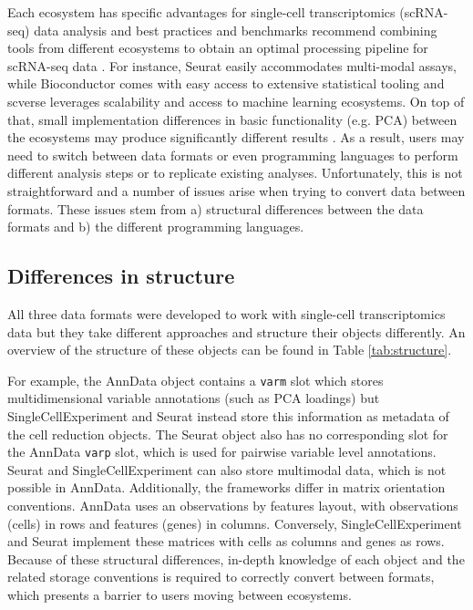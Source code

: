 \documentclass[unnumsec,webpdf,modern,large,namedate]{oup-authoring-template}%
\begin{document}
Each ecosystem has specific advantages for single-cell tran\-scriptomics (scRNA-seq) 
data analysis and best practices and benchmarks recommend combining tools from different ecosystems to obtain an optimal processing pipeline for scRNA-seq data \citep{Heumos2023-qa}. 
For instance, Seurat easily accommodates multi-modal assays, while Bioconductor comes with easy access to extensive statistical tooling and scverse leverages scalability and access to machine learning ecosystems.
On top of that, small implementation differences in basic functionality (e.g. PCA) between the ecosystems may produce significantly different results \citep{rich2024impact}.
As a result, users may need to switch between data formats or even programming languages to perform different analysis steps or to replicate existing analyses. 
Unfortunately, this is not straightforward and a number of issues arise when trying to convert data between formats. 
These issues stem from a) structural differences between the data formats and b) the different programming languages.

\subsection{Differences in structure}\label{structure}

All three data formats were developed to work with single-cell transcriptomics data but they take different approaches and structure their objects differently. An overview of the structure of these objects can be found in Table \ref{tab:structure}.

For example, the AnnData object contains a \texttt{varm} slot which stores 
multidimensional variable annotations (such as PCA loadings) but SingleCellExperiment 
and Seurat instead store this in\-for\-ma\-tion as metadata of the cell reduction objects. 
The Seurat object also has no corresponding slot for the AnnData \texttt{varp} slot, which is used for pairwise variable level annotations. 
Seurat and SingleCellExperiment can also store multimodal data, which is not possible in AnnData. 
Additionally, the frameworks differ in matrix orientation conventions. AnnData uses an observations by features layout, with observations (cells) in rows and features (genes) in columns. 
Conversely, SingleCellExperiment and Seurat implement these matrices with cells as columns and genes as rows. 
Because of these structural differences, in-depth knowledge of each object and the related storage conventions is required to correctly convert between formats, which presents a barrier to users moving between ecosystems.
\end{document}
